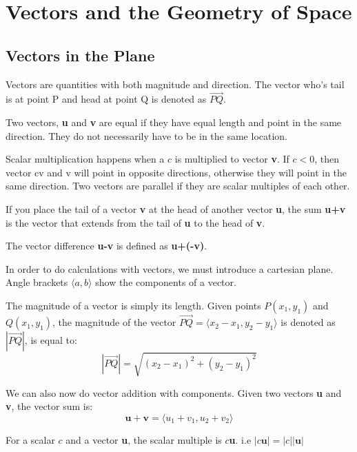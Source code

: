 \documentclass[../calc3.tex]{subfiles}
\begin{document}
\chapter{Vectors and the Geometry of Space}
\section{Vectors in the Plane}
Vectors are quantities with both magnitude and direction. The vector who's tail is at point 
P and head at point Q is denoted as $\overrightarrow{PQ}$.

Two vectors, \textbf{u} and \textbf{v} are equal if they have equal length and point 
in the same direction. They do not necessarily have to be in the same location.

Scalar multiplication happens when a $c$ is multiplied to vector \textbf{v}. If $c<0$, then 
vector cv and v will point in opposite directions, otherwise they will point in the same direction. 
Two vectors are parallel if they are scalar multiples of each other.

If you place the tail of a vector \textbf{v} at the head of another vector \textbf{u}, the sum 
\textbf{u+v} is the vector that extends from the tail of \textbf{u} to the head of \textbf{v}.

The vector difference \textbf{u-v} is defined as \textbf{u+(-v)}.

In order to do calculations with vectors, we must introduce a cartesian plane. Angle brackets 
$\langle{a,b}\rangle$ show the components of a vector.

The magnitude of a vector is simply its length. Given points $P(x_1,y_1)$ and $Q(x_1,y_1)$, 
the magnitude of the vector $\vec{PQ}=\langle{x_2-x_1,y_2-y_1}\rangle$ is denoted as $|\vec{PQ}|$, is equal to:
    \[|\vec{PQ}|=\sqrt{(x_2-x_1)^2+(y_2-y_1)^2}\]

We can also now do vector addition with components. Given two vectors \textbf{u} and \textbf{v}, the vector sum is:
    \[\textbf{u}+\textbf{v}=\langle{u_1+v_1,u_2+v_2}\rangle\]


For a scalar $c$ and a vector \textbf{u}, the scalar multiple is $c$\textbf{u}. i.e $|c\textbf{u}|=|c||\textbf{u}|$
\end{document}
